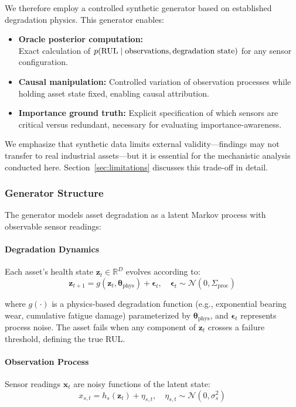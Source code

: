 We therefore employ a controlled synthetic generator based on established degradation physics. This generator enables:
\begin{itemize}
    \item \textbf{Oracle posterior computation:}\\
    Exact calculation of $p(\text{RUL} \mid \text{observations}, \text{degradation state})$ for any sensor configuration.
    \item \textbf{Causal manipulation:} Controlled variation of observation processes while holding asset state fixed, enabling causal attribution.
    \item \textbf{Importance ground truth:} Explicit specification of which sensors are critical versus redundant, necessary for evaluating importance-awareness.
\end{itemize}

We emphasize that synthetic data limits external validity—findings may not transfer to real industrial assets—but it is essential for the mechanistic analysis conducted here. Section~\ref{sec:limitations} discusses this trade-off in detail.

\subsubsection{Generator Structure}

The generator models asset degradation as a latent Markov process with observable sensor readings:

\paragraph{Degradation Dynamics}
Each asset's health state $\mathbf{z}_t \in \mathbb{R}^{D}$ evolves according to:
\[
\mathbf{z}_{t+1} = g(\mathbf{z}_t, \boldsymbol{\theta}_{\text{phys}}) + \boldsymbol{\epsilon}_t, \quad \boldsymbol{\epsilon}_t \sim \mathcal{N}(0, \Sigma_{\text{proc}})
\]

where $g(\cdot)$ is a physics-based degradation function (e.g., exponential bearing wear, cumulative fatigue damage) parameterized by $\boldsymbol{\theta}_{\text{phys}}$, and $\boldsymbol{\epsilon}_t$ represents process noise. The asset fails when any component of $\mathbf{z}_t$ crosses a failure threshold, defining the true RUL.

\paragraph{Observation Process}
Sensor readings $\mathbf{x}_t$ are noisy functions of the latent state:
\[
x_{s,t} = h_s(\mathbf{z}_t) + \eta_{s,t}, \quad \eta_{s,t} \sim \mathcal{N}(0, \sigma_s^2)
\]


